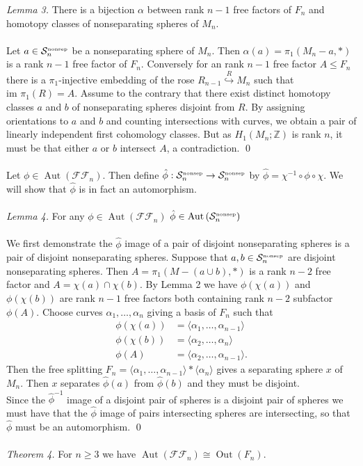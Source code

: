 \documentclass[12pt]{article}
\newcommand{\Z}{\mathbb{Z}}
\newcommand{\Aut}[1]{\ensuremath{ \aaut \left (#1 \right ) }}
\newcommand{\nosep}{{\ensuremath{ \mathcal S^{\mbox{\tiny{nonsep}}}_n }}}
\newcommand{\ffn}{{\ensuremath{ \mathcal {FF}_n }}}
\DeclareMathOperator{\oout}{Out}
\DeclareMathOperator{\aaut}{Aut}
\begin{document}
\noindent \emph{Lemma 3.} There is a bijection $\alpha$ between rank $n-1$ free factors of $F_n$ and homotopy classes of nonseparating spheres of $M_n$.\\
\\
Let $a \in \nosep$ be a nonseparating sphere of $M_n$.
Then $\alpha(a)=\pi_1 (M_n-a,\ast)$ is a rank $n-1$ free factor of $F_n$.
Conversely for an rank $n-1$ free factor $A \leq F_n$ there is a $\pi_1$-injective embedding of the rose $R_{n-1} \stackrel{R}\hookrightarrow M_n$ such that $\mbox{im } \pi_1(R) = A$. 
Assume to the contrary that there exist distinct homotopy classes $a$ and $b$ of nonseparating spheres disjoint from $R$.
By assigning orientations to $a$ and $b$ and counting intersections with curves, we obtain a pair of linearly independent first cohomology classes. But as $H_1(M_n;\Z)$ is rank $n$, it must be that either $a$ or $b$ intersect $A$, a contradiction. \qed\\
\\
Let $\phi \in \Aut{\ffn}$. 
Then define $\hat \phi:\nosep \to \nosep$  by $\hat \phi= \chi^{-1} \circ \phi \circ \chi$. We will show that $\hat \phi$ is in fact an automorphism.\\
\\
\noindent \emph{Lemma 4.} For any $\phi \in \aaut (\ffn )$  $\hat \phi \in \aaut \left ( \nosep \right )$\\
\\
We first demonstrate the $\hat \phi$ image of a pair of disjoint nonseparating spheres is a pair of disjoint nonseparating spheres.
Suppose that $a,b \in \nosep$ are disjoint nonseparating spheres. Then $A=\pi_1 \left (M-(a\cup b),\ast \right )$ is a rank $n-2$ free factor and $A =\chi(a) \cap \chi(b)$.
By Lemma 2 we have $\phi (\chi (a))$ and $\phi (\chi (b))$ are rank $n-1$ free factors both containing rank $n-2$ subfactor $\phi(A)$.
Choose curves $\alpha_1, \ldots, \alpha_n$ giving a basis of $F_n$ such that 
\begin{align*}
\phi(\chi(a)) &=\langle \alpha_1, \ldots, \alpha_{n-1} \rangle\\
\phi(\chi(b)) &=\langle \alpha_2, \ldots, \alpha_{n} \rangle\\
\phi(A) &=\langle \alpha_2, \ldots, \alpha_{n-1} \rangle.
\end{align*}
Then the free splitting $F_n= \langle \alpha_1, \ldots, \alpha_{n-1} \rangle \ast \langle \alpha_{n} \rangle$ gives a separating sphere $x$ of $M_n$.
Then $x$ separates $\hat \phi (a)$ from $\hat \phi (b)$ and they must be disjoint. \\
Since the $\hat \phi^{-1}$ image of a disjoint pair of spheres is a disjoint pair of spheres we must have that  the $\hat \phi$ image of pairs intersecting spheres are intersecting, so that $\hat \phi$ must be an automorphism.
\qed \\
\\
\noindent \emph{Theorem 4.} For $n\geq 3$ we have $\aaut (\ffn) \cong \oout( F_n)$.
\\
\end{document}
